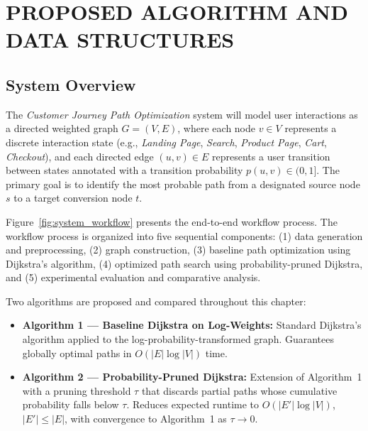\chapter{PROPOSED ALGORITHM AND DATA STRUCTURES}

\section{System Overview}

The \textit{Customer Journey Path Optimization} system will model user interactions as a directed weighted graph $G = (V, E)$, where each node $v \in V$ represents a discrete interaction state (e.g., \textit{Landing Page}, \textit{Search}, \textit{Product Page}, \textit{Cart}, \textit{Checkout}), and each directed edge $(u,v) \in E$ represents a user transition between states annotated with a transition probability $p(u,v) \in (0,1]$. The primary goal is to identify the most probable path from a designated source node $s$ to a target conversion node $t$.

Figure~\ref{fig:system_workflow} presents the end-to-end workflow process. The workflow process is organized into five sequential components: (1) data generation and preprocessing, (2) graph construction, (3) baseline path optimization using Dijkstra's algorithm, (4) optimized path search using probability-pruned Dijkstra, and (5) experimental evaluation and comparative analysis.

Two algorithms are proposed and compared throughout this chapter:
\begin{itemize}
    \item \textbf{Algorithm 1 --- Baseline Dijkstra on Log-Weights:} Standard Dijkstra's algorithm applied to the log-probability-transformed graph. Guarantees globally optimal paths in $O(|E|\log|V|)$ time.
    \item \textbf{Algorithm 2 --- Probability-Pruned Dijkstra:} Extension of Algorithm~1 with a pruning threshold $\tau$ that discards partial paths whose cumulative probability falls below $\tau$. Reduces expected runtime to $O(|E'|\log|V|)$, $|E'| \leq |E|$, with convergence to Algorithm~1 as $\tau \to 0$.
\end{itemize}

